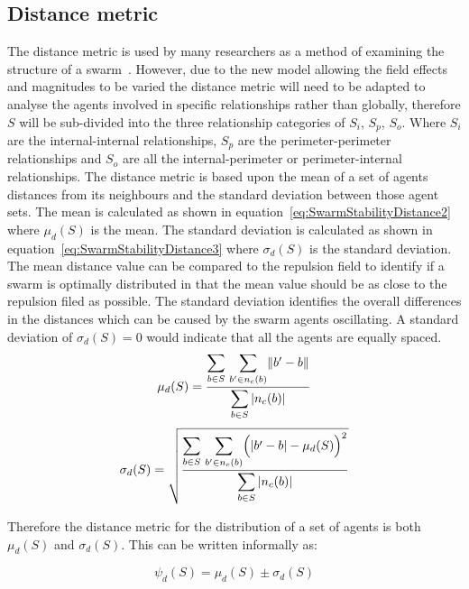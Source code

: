\documentclass[12pt,a4paper]{IEEEtran}
\newcommand{\magn}[1]{\Vert{#1}\Vert}
\newcommand{\card}[1]{\vert{#1}\vert}
\newcommand{\vbb}[2]{#2-#1}
\begin{document}
\subsection{Distance metric}
The distance metric is used by many researchers as a method of examining the structure of a swarm~\cite{BAFVM:06,BAF:06,elamvazhuthi2015optimal,VG:05,SW:03}. However, due to the new model allowing the field effects and magnitudes to be varied the distance metric will need to be adapted to analyse the agents involved in specific relationships rather than globally, therefore $S$ will be sub-divided into the three relationship categories of $S_i$, $S_p$, $S_{o}$. Where $S_i$ are the internal-internal relationships, $S_p$ are the perimeter-perimeter relationships and $S_{o}$ are all the internal-perimeter or perimeter-internal relationships. 
The distance metric is based upon the mean of a set of agents distances from its neighbours and the standard deviation between those agent sets. The mean is calculated as shown in equation~\ref{eq:SwarmStabilityDistance2} where $\mu_d(S)$ is the mean. The standard deviation is calculated as shown in equation~\ref{eq:SwarmStabilityDistance3} where $\sigma_d(S)$ is the standard deviation. The mean distance value can be compared to the repulsion field to identify if a swarm is optimally distributed in that the mean value should be as close to the repulsion filed as possible. The standard deviation identifies the overall differences in the distances which can be caused by the swarm agents oscillating. A standard deviation of $\sigma_d(S) = 0$ would indicate that all the agents are equally spaced.
\small
\begin{equation}
\label{eq:SwarmStabilityDistance2}
\mu_d(S) = \frac{\mathlarger{\sum_{b \in S}}~\mathlarger{\sum_{b' \in n_c(b)}}\magn{\vbb{b}{b'}}}{\mathlarger{\sum_{b \in S}\card{n_c(b)}}}
\end{equation}
\normalsize
\small
\begin{equation}
\label{eq:SwarmStabilityDistance3}
\sigma_d(S) = \sqrt{\frac{\mathlarger{\sum_{b \in S}}~\mathlarger{\sum_{b' \in n_c(b)}}\Big(\card{\vbb{b}{b'}} - \mu_d(S)\Big)^2}{\mathlarger{\sum_{b \in S}\card{n_c(b)}}}}
\end{equation}
\normalsize

Therefore the distance metric for the distribution of a set of agents is both $\mu_d(S)$ and $\sigma_d(S)$. This can be written informally as:

\small
\begin{equation}
\label{eq:SwarmPotentialMagnitude}
\psi_d(S) = \mu_d(S)\pm \sigma_d(S)
\end{equation}
\normalsize
\end{document}
